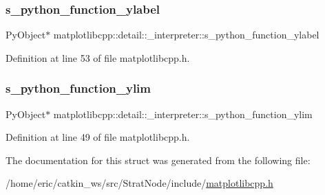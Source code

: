 \subsubsection{\texorpdfstring{s\_python\_function\_ylabel}{s\_python\_function\_ylabel}}
{\footnotesize\ttfamily Py\+Object$\ast$ matplotlibcpp\+::detail\+::\+\_\+interpreter\+::s\+\_\+python\+\_\+function\+\_\+ylabel}



Definition at line 53 of file matplotlibcpp.\+h.

\mbox{\label{structmatplotlibcpp_1_1detail_1_1__interpreter_afa69df018d0a76c3525693f09197176f}} 
\subsubsection{\texorpdfstring{s\_python\_function\_ylim}{s\_python\_function\_ylim}}
{\footnotesize\ttfamily Py\+Object$\ast$ matplotlibcpp\+::detail\+::\+\_\+interpreter\+::s\+\_\+python\+\_\+function\+\_\+ylim}



Definition at line 49 of file matplotlibcpp.\+h.



The documentation for this struct was generated from the following file\+:\begin{DoxyCompactItemize}
\item 
/home/eric/catkin\+\_\+ws/src/\+Strat\+Node/include/\mbox{\hyperlink{matplotlibcpp_8h}{matplotlibcpp.\+h}}\end{DoxyCompactItemize}
